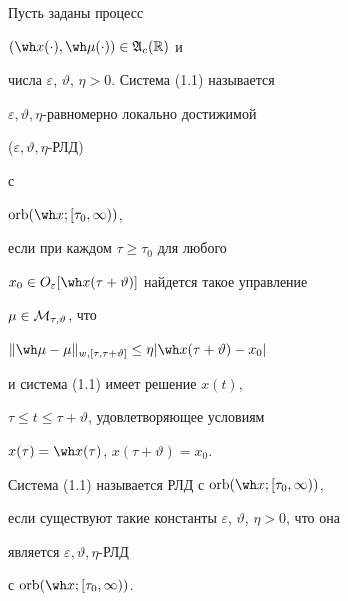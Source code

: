 \begin{defns}


Пусть заданы процесс


$(\wh x(\cdot),\wh\mu(\cdot))\in\frak A_c(\Bbb R)$ и


числа $\varepsilon$, $\vartheta$, $\eta>0$. Система (1.1) называется


$\varepsilon,\vartheta,\eta$-равномерно локально достижимой


($\varepsilon,\vartheta,\eta$-РЛД)


с


$\orb(\wh x;[\tau_0,\infty))$,


если при каждом $\tau\ge\tau_0$ для любого


$x_0\in O_{\varepsilon}[\wh x(\tau+\vartheta)]$ найдется такое управление


$\mu\in\cal M_{\tau,\vartheta}$, что


$\|\wh\mu-\mu\|_{w,[\tau,\tau+\vartheta]}


\le\eta|\wh x(\tau+\vartheta)-x_0|$


и система (1.1) имеет решение $x(t)$,


$\tau\le t\le\tau+\vartheta$, удовлетворяющее условиям


$x(\tau)=\wh x(\tau)$, $x(\tau+\vartheta)=x_0$.


Система (1.1) называется РЛД с $\orb(\wh x;[\tau_0,\infty))$,


если существуют такие константы $\varepsilon$, $\vartheta$, $\eta>0$, что она


является $\varepsilon,\vartheta,\eta$-РЛД


с $\orb(\wh x;[\tau_0,\infty))$.


\end{defns}








